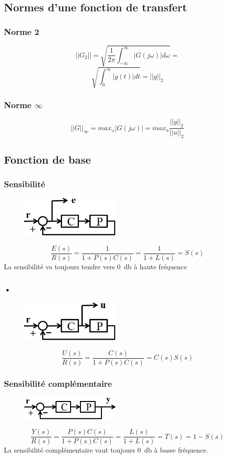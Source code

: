 \documentclass[resume]{subfiles}
\begin{document}
\subsection{Normes d'une fonction de transfert}

\subsubsection{Norme 2}

$$
||G_2|| = \sqrt{\frac{1}{2\pi}\int_{-\infty}^{\infty}|G(j\omega)| d\omega}=$$
$$\sqrt{\int_{0}^{\infty}|g(t)| dt} = ||g||_2$$

\subsubsection{Norme $\infty$}

$$
||G||_{\infty} = max_{\omega}|G(j\omega)| = max_{u} \frac{||y||_2}{||u||_2}
$$

\subsection{Fonction de base}
\subsubsection{Sensibilité}
\begin{figure}[H]
\centering
\includegraphics[width=5.00cm]{img_8.png}
\end{figure}
$$\frac{E(s)}{R(s)}=\frac{1}{1+P(s)C(s)}=\frac{1}{1+L(s)}=S(s)$$
La sensibilité va toujours tendre vers \SI{0}{\decibel} à haute fréquence
\subsubsection{•}
\begin{figure}[H]
\centering
\includegraphics[width=5.00cm]{img_9.png}
\end{figure}
$$\frac{U(s)}{R(s)}=\frac{C(s)}{1+P(s)C(s)}=C(s)S(s)$$
\subsubsection{Sensibilité complémentaire}
\begin{figure}[H]
\centering
\includegraphics[width=5.00cm]{img_10.png}
\end{figure}
$$\frac{Y(s)}{R(s)}=\frac{P(s)C(s)}{1+P(s)C(s)}=\frac{L(s)}{1+L(s)}=T(s)=1-S(s)$$
La sensibilité complémentaire vaut toujours \SI{0}{\decibel} à basse fréquence.
\end{document}
